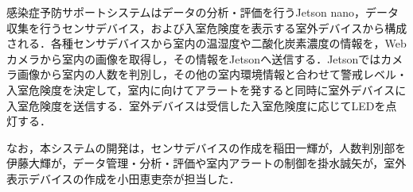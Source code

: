 感染症予防サポートシステムはデータの分析・評価を行うJetson nano，データ収集を行うセンサデバイス，および入室危険度を表示する室外デバイスから構成される．各種センサデバイスから室内の温湿度や二酸化炭素濃度の情報を，Webカメラから室内の画像を取得し，その情報をJetsonへ送信する．Jetsonではカメラ画像から室内の人数を判別し，その他の室内環境情報と合わせて警戒レベル・入室危険度を決定して，室内に向けてアラートを発すると同時に室外デバイスに入室危険度を送信する．室外デバイスは受信した入室危険度に応じてLEDを点灯する．


なお，本システムの開発は，センサデバイスの作成を稲田一輝が，人数判別部を伊藤大輝が，データ管理・分析・評価や室内アラートの制御を掛水誠矢が，室外表示デバイスの作成を小田恵吏奈が担当した．